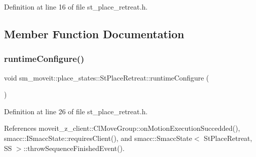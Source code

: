 Definition at line 16 of file st\+\_\+place\+\_\+retreat.\+h.



\subsection{Member Function Documentation}
\mbox{\label{structsm__moveit_1_1place__states_1_1StPlaceRetreat_ab821f5ef9e9ffb35ba9f63917dac2854}} 
\subsubsection{\texorpdfstring{runtime\+Configure()}{runtimeConfigure()}}
{\footnotesize\ttfamily void sm\+\_\+moveit\+::place\+\_\+states\+::\+St\+Place\+Retreat\+::runtime\+Configure (\begin{DoxyParamCaption}{ }\end{DoxyParamCaption})\hspace{0.3cm}{\ttfamily [inline]}}



Definition at line 26 of file st\+\_\+place\+\_\+retreat.\+h.



References moveit\+\_\+z\+\_\+client\+::\+Cl\+Move\+Group\+::on\+Motion\+Execution\+Succedded(), smacc\+::\+I\+Smacc\+State\+::requires\+Client(), and smacc\+::\+Smacc\+State$<$ St\+Place\+Retreat, S\+S $>$\+::throw\+Sequence\+Finished\+Event().


